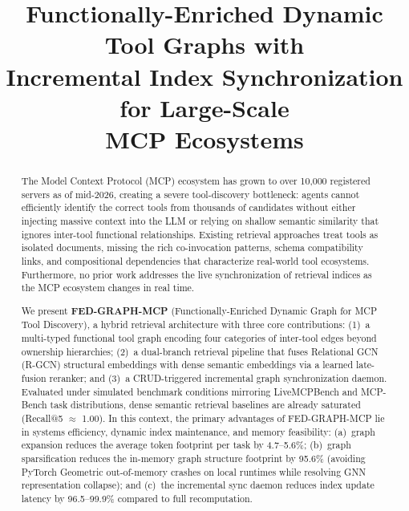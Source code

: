\documentclass[conference]{IEEEtran}
\begin{document}
\title{Functionally-Enriched Dynamic Tool Graphs with\\
Incremental Index Synchronization for Large-Scale\\
MCP Ecosystems}

\author{
}

\maketitle

\begin{abstract}
The Model Context Protocol (MCP) ecosystem has grown to over 10,000
registered servers as of mid-2026, creating a severe tool-discovery
bottleneck: agents cannot efficiently identify the correct tools from
thousands of candidates without either injecting massive context into
the LLM or relying on shallow semantic similarity that ignores
inter-tool functional relationships. Existing retrieval approaches
treat tools as isolated documents, missing the rich co-invocation
patterns, schema compatibility links, and compositional dependencies
that characterize real-world tool ecosystems. Furthermore, no prior
work addresses the live synchronization of retrieval indices as the
MCP ecosystem changes in real time.

We present \textbf{FED-GRAPH-MCP} (Functionally-Enriched Dynamic Graph
for MCP Tool Discovery), a hybrid retrieval architecture with three
core contributions: (1)~a multi-typed functional tool graph encoding
four categories of inter-tool edges beyond ownership hierarchies;
(2)~a dual-branch retrieval pipeline that fuses Relational GCN
(R-GCN) structural embeddings with dense semantic embeddings via a
learned late-fusion reranker; and (3)~a CRUD-triggered incremental
graph synchronization daemon. Evaluated under simulated benchmark
conditions mirroring LiveMCPBench and MCP-Bench task distributions,
dense semantic retrieval baselines are already saturated (Recall@5
$\approx$ 1.00). In this context, the primary advantages of
FED-GRAPH-MCP lie in systems efficiency, dynamic index maintenance,
and memory feasibility: (a)~graph expansion reduces the average
token footprint per task by 4.7--5.6\%; (b)~graph sparsification
reduces the in-memory graph structure footprint by 95.6\% (avoiding
PyTorch Geometric out-of-memory crashes on local runtimes while
resolving GNN representation collapse); and (c)~the incremental sync
daemon reduces index update latency by 96.5--99.9\% compared to full
recomputation.
\end{abstract}
\end{document}
